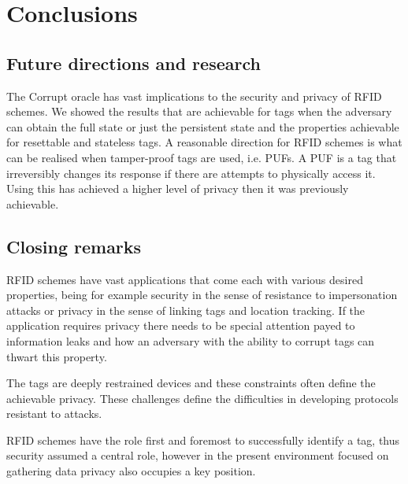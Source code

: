 \chapter*{Conclusions} 

\section*{Future directions and research}
The Corrupt oracle has vast implications to the security and privacy of RFID schemes. We showed the results that are achievable for tags
when the adversary can obtain the full state or just the persistent state and the properties achievable for resettable and stateless tags.
A reasonable direction for RFID schemes is what can be realised when tamper-proof tags are used, i.e. PUFs. A PUF is a tag that irreversibly changes 
its response if there are attempts to physically access it. Using this \cite{PUFs} has achieved a higher level of privacy then it was 
previously achievable.

\section*{Closing remarks}
RFID schemes have vast applications that come each with various desired properties, being for example security in the sense of resistance to impersonation attacks 
or privacy in the sense of linking tags and location tracking. If the application requires privacy there needs to be special attention payed to information leaks
and how an adversary with the ability to corrupt tags can thwart this property.

The tags are deeply restrained devices and these constraints often define the achievable privacy. These challenges define the difficulties in developing protocols
resistant to attacks.

RFID schemes have the role first and foremost to successfully identify a tag, thus security assumed a central role, however in the present environment focused on 
gathering data privacy also occupies a key position.